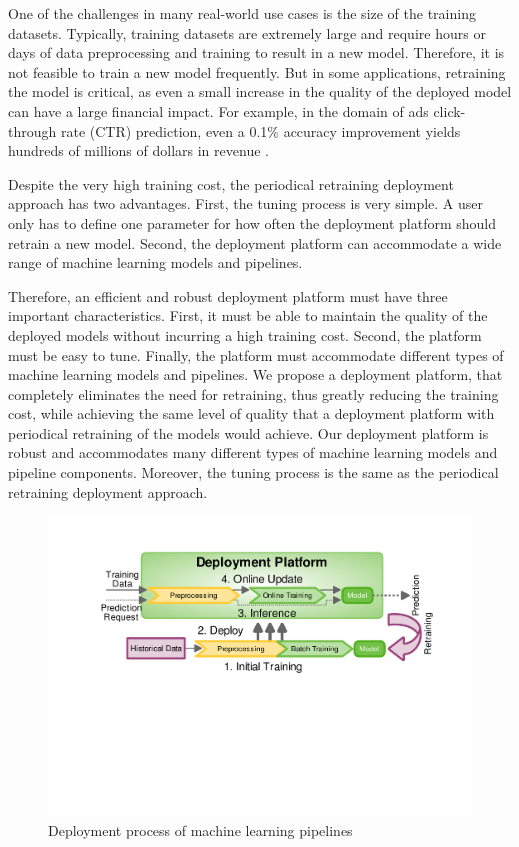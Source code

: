 One of the challenges in many real-world use cases is the size of the training datasets.
Typically, training datasets are extremely large and require hours or days of data preprocessing and training to result in a new model.
Therefore, it is not feasible to train a new model frequently.
But in some applications, retraining the model is critical, as even a small increase in the quality of the deployed model can have a large financial impact.
For example, in the domain of ads click-through rate (CTR) prediction, even a 0.1\% accuracy improvement yields hundreds of millions of dollars in revenue \cite{ling2017model}.

Despite the very high training cost, the periodical retraining deployment approach has two advantages.
First, the tuning process is very simple.
A user only has to define one parameter for how often the deployment platform should retrain a new model.
Second, the deployment platform can accommodate a wide range of machine learning models and pipelines.

Therefore, an efficient and robust deployment platform must have three important characteristics.
First, it must be able to maintain the quality of the deployed models without incurring a high training cost.
Second, the platform must be easy to tune.
Finally, the platform must accommodate different types of machine learning models and pipelines.
We propose a deployment platform, that completely eliminates the need for retraining, thus greatly reducing the training cost, while achieving the same level of quality that a deployment platform with periodical retraining of the models would achieve.
Our deployment platform is robust and accommodates many different types of machine learning models and pipeline components.
Moreover, the tuning process is the same as the periodical retraining deployment approach.

\begin{figure}[h!]
\centering
\includegraphics[width=\columnwidth]{../images/generic-motivational-example-v2.pdf}
\caption{Deployment process of machine learning pipelines}
\label{fig:motivational-example}
\end{figure}

